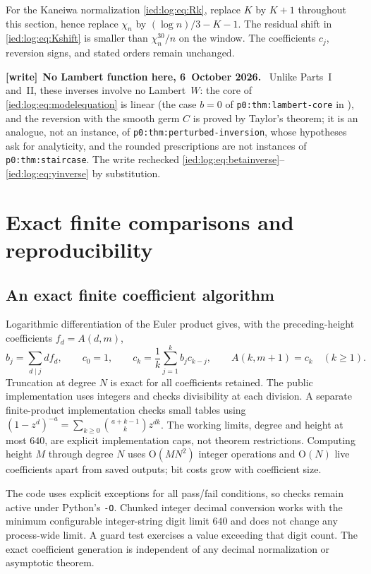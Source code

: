 \documentclass[11pt,letterpaper]{article}
\theoremstyle{remark}\newtheorem{remark}[theorem]{Remark}
\newcommand{\Oh}{\mathrm O}\newcommand{\supp}{\operatorname{supp}}
\newenvironment{writenote}[1][]{\par\smallskip\begingroup\small
 \noindent\textbf{[write]}\if\relax\detokenize{#1}\relax\else~\textbf{#1.}\fi\ }%
 {\par\endgroup\smallskip}
\begin{document}
For the Kaneiwa normalization \eqref{ied:log:eq:Rk}, replace $K$ by $K+1$ throughout this section, hence replace $\chi_n$ by $(\log n)/3-K-1$. The residual shift in \eqref{ied:log:eq:Kshift} is smaller than $\chi_n^{30}/n$ on the window. The coefficients $c_j$, reversion signs, and stated orders remain unchanged.

\begin{writenote}[No Lambert function here, 6~October 2026]
Unlike Parts~I and~II, these inverses involve no Lambert~$W$: the core of \eqref{ied:log:eq:modelequation} is linear (the case $b=0$ of \texttt{p0:thm:lambert-core} in \cite{TSvol}), and the reversion with the smooth germ $C$ is proved by Taylor's theorem; it is an analogue, not an instance, of \texttt{p0:thm:perturbed-inversion}, whose hypotheses ask for analyticity, and the rounded prescriptions are not instances of \texttt{p0:thm:staircase}. The write rechecked \eqref{ied:log:eq:betainverse}--\eqref{ied:log:eq:yinverse} by substitution.
\end{writenote}

\section{Exact finite comparisons and reproducibility}\label{ied:log:sec:computation}
\subsection{An exact finite coefficient algorithm}
Logarithmic differentiation of the Euler product gives, with the preceding-height coefficients $f_d=A(d,m)$,
\begin{equation}\label{ied:log:eq:integerrecurrence}
 b_j=\sum_{d\mid j}d f_d,\qquad c_0=1,\qquad
 c_k=\frac1k\sum_{j=1}^kb_jc_{k-j},\qquad
 A(k,m+1)=c_k\quad(k\ge1).
\end{equation}
Truncation at degree $N$ is exact for all coefficients retained. The public implementation uses integers and checks divisibility at each division. A separate finite-product implementation checks small tables using
$(1-z^d)^{-a}=\sum_{k\ge0}\binom{a+k-1}{k}z^{dk}$.
The working limits, degree and height at most $640$, are explicit implementation caps, not theorem restrictions. Computing height $M$ through degree $N$ uses $\Oh(MN^2)$ integer operations and $\Oh(N)$ live coefficients apart from saved outputs; bit costs grow with coefficient size.

The code uses explicit exceptions for all pass/fail conditions, so checks remain active under Python's \texttt{-O}. Chunked integer decimal conversion works with the minimum configurable integer-string digit limit $640$ and does not change any process-wide limit. A guard test exercises a value exceeding that digit count. The exact coefficient generation is independent of any decimal normalization or asymptotic theorem.
\end{document}
